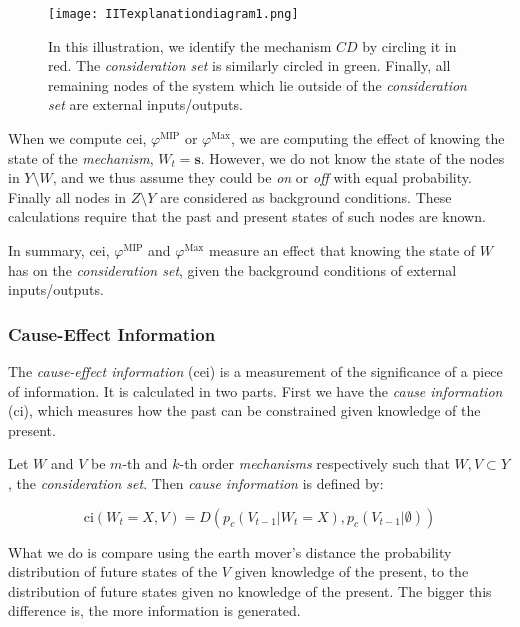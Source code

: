 \begin{figure}[ht]
	\centering
	
	\texttt{[image: IITexplanationdiagram1.png]}
	\caption{In this illustration, we identify the mechanism $CD$ by circling it in red. The \textit{consideration set} is similarly circled in green. Finally, all remaining nodes of the system which lie outside of the \textit{consideration set} are external inputs/outputs.}
	\label{fig:IIT_illustration1}
\end{figure}

When we compute cei, $\varphi^{\text{MIP}}$ or $\varphi^{\text{Max}}$, we are computing the effect of knowing the state of the \textit{mechanism}, $W_t = \mathbf{s}$. However, we do not know the state of the nodes in $Y\setminus W$, and we thus assume they could be \textit{on} or \textit{off} with equal probability. Finally all nodes in $Z \setminus Y$ are considered as background conditions. These calculations require that the past and present states of such nodes are known. 

In summary, cei, $\varphi^{\text{MIP}}$ and $\varphi^{\text{Max}}$ measure an effect that knowing the state of $W$ has on the \textit{consideration set}, given the background conditions of external inputs/outputs.

\subsubsection{Cause-Effect Information}
\label{sec:cei}
The \textit{cause-effect information} (cei) is a measurement of the significance of a piece of information. It is calculated in two parts. First we have the \textit{cause information} (ci), which measures how the past can be constrained given knowledge of the present. 

Let $W$ and $V$ be $m$-th and $k$-th order \textit{mechanisms} respectively such that $W,V \subset Y$, the \textit{consideration set}. Then \textit{cause information} is defined \cite{oizumi2014phenomenology} by:

\begin{equation}
\label{def:ci}
\text{ci}(W_{t} = X, V) = D\left(p_c(V_{t-1}|W_{t} = X),p_c(V_{t-1}|\emptyset)\right)
\end{equation}

What we do is compare using the earth mover's distance the probability distribution of future states of the  $V $ given knowledge of the present, to the distribution of future states given no knowledge of the present. The bigger this difference is, the more information is generated. 

